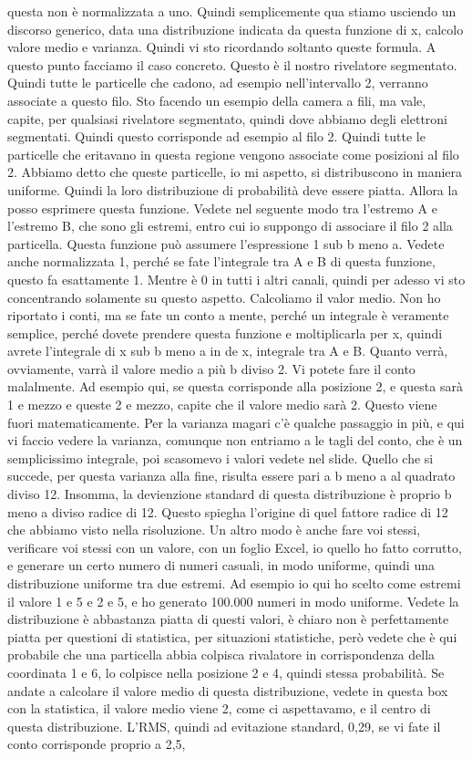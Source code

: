 questa non è normalizzata a uno. Quindi semplicemente qua stiamo usciendo un discorso generico, data una distribuzione indicata da questa funzione di x, calcolo valore medio e varianza. Quindi vi sto ricordando soltanto queste formula. A questo punto facciamo il caso concreto. Questo è il nostro rivelatore segmentato. Quindi tutte le particelle che cadono, ad esempio nell'intervallo 2, verranno associate a questo filo. Sto facendo un esempio della camera a fili, ma vale, capite, per qualsiasi rivelatore segmentato, quindi dove abbiamo degli elettroni segmentati. Quindi questo corrisponde ad esempio al filo 2. Quindi tutte le particelle che eritavano in questa regione vengono associate come posizioni al filo 2. Abbiamo detto che queste particelle, io mi aspetto, si distribuscono in maniera uniforme. Quindi la loro distribuzione di probabilità deve essere piatta. Allora la posso esprimere questa funzione. Vedete nel seguente modo tra l'estremo A e l'estremo B, che sono gli estremi, entro cui io suppongo di associare il filo 2 alla particella. Questa funzione può assumere l'espressione 1 sub b meno a. Vedete anche normalizzata 1, perché se fate l'integrale tra A e B di questa funzione, questo fa esattamente 1. Mentre è 0 in tutti i altri canali, quindi per adesso vi sto concentrando solamente su questo aspetto. Calcoliamo il valor medio. Non ho riportato i conti, ma se fate un conto a mente, perché un integrale è veramente semplice, perché dovete prendere questa funzione e moltiplicarla per x, quindi avrete l'integrale di x sub b meno a in de x, integrale tra A e B. Quanto verrà, ovviamente, varrà il valore medio a più b diviso 2. Vi potete fare il conto malalmente. Ad esempio qui, se questa corrisponde alla posizione 2, e questa sarà 1 e mezzo e queste 2 e mezzo, capite che il valore medio sarà 2. Questo viene fuori matematicamente. Per la varianza magari c'è qualche passaggio in più, e qui vi faccio vedere la varianza, comunque non entriamo a le tagli del conto, che è un semplicissimo integrale, poi scasomevo i valori vedete nel slide. Quello che si succede, per questa varianza alla fine, risulta essere pari a b meno a al quadrato diviso 12. Insomma, la devienzione standard di questa distribuzione è proprio b meno a diviso radice di 12. Questo spiegha l'origine di quel fattore radice di 12 che abbiamo visto nella risoluzione. Un altro modo è anche fare voi stessi, verificare voi stessi con un valore, con un foglio Excel, io quello ho fatto corrutto, e generare un certo numero di numeri casuali, in modo uniforme, quindi una distribuzione uniforme tra due estremi. Ad esempio io qui ho scelto come estremi il valore 1 e 5 e 2 e 5, e ho generato 100.000 numeri in modo uniforme. Vedete la distribuzione è abbastanza piatta di questi valori, è chiaro non è perfettamente piatta per questioni di statistica, per situazioni statistiche, però vedete che è qui probabile che una particella abbia colpisca rivalatore in corrispondenza della coordinata 1 e 6, lo colpisce nella posizione 2 e 4, quindi stessa probabilità. Se andate a calcolare il valore medio di questa distribuzione, vedete in questa box con la statistica, il valore medio viene 2, come ci aspettavamo, e il centro di questa distribuzione. L'RMS, quindi ad evitazione standard, 0,29, se vi fate il conto corrisponde proprio a 2,5, 